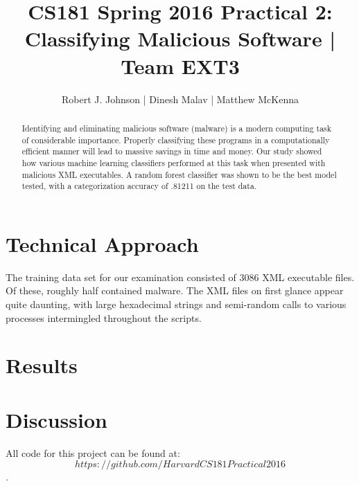 \documentclass{article}
\begin{document}
\title{CS181 Spring 2016 Practical 2: Classifying Malicious Software | Team EXT3}
\author{Robert J. Johnson | Dinesh Malav | Matthew McKenna}



\maketitle

\begin{abstract}
Identifying and eliminating malicious software (malware) is a modern computing task of considerable importance. Properly classifying these programs in a computationally efficient manner will lead to massive savings in time and money. Our study showed how various machine learning classifiers performed at this task when presented with malicious XML executables. A random forest classifier was shown to be the best model tested, with a categorization accuracy of .81211 on the test data. 
\end{abstract}

\section{Technical Approach}
The training data set for our examination consisted of 3086 XML executable files. Of these, roughly half contained malware. The XML files on first glance appear quite daunting, with large hexadecimal strings and semi-random calls to various processes intermingled throughout the scripts.


\section{Results}



\section{Discussion}
All code for this project can be found at: $$https://github.com/HarvardCS181Practical2016$$.
\end{document}
